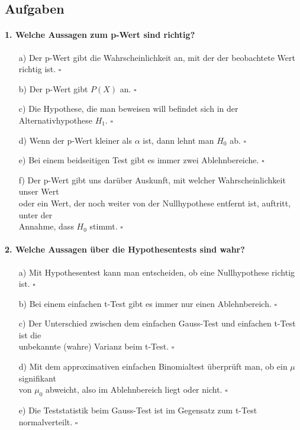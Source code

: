 \documentclass[a4paper]{article}
\begin{document}
\clearpage

\subsection{Aufgaben}
\paragraph{1. Welche Aussagen zum p-Wert sind richtig?}
\begin{itemize}
    \item[a)] Der p-Wert gibt die Wahrscheinlichkeit an, mit der der beobachtete Wert richtig ist. \hfill $\square$
    \item[b)] Der p-Wert gibt $P(X)$ an. \hfill $\square$
    \item[c)] Die Hypothese, die man beweisen will befindet sich in der Alternativhypothese $H_1$. \hfill $\square$
    \item[d)] Wenn der p-Wert kleiner als $\alpha$ ist, dann lehnt man $H_0$ ab. \hfill $\square$
    \item[e)] Bei einem beidseitigen Test gibt es immer zwei Ablehnbereiche. \hfill $\square$
    \item[f)] Der p-Wert gibt uns darüber Auskunft, mit welcher Wahrscheinlichkeit unser Wert \\oder ein Wert, der noch weiter von der Nullhypothese entfernt ist, auftritt, unter der\\ Annahme, dass $H_0$ stimmt. \hfill $\square$
\end{itemize}

\paragraph{2. Welche Aussagen über die Hypothesentests sind wahr?}
\begin{itemize}
    \item[a)] Mit Hypothesentest kann man entscheiden, ob eine Nullhypothese richtig ist. \hfill $\square$
    \item[b)] Bei einem einfachen t-Test gibt es immer nur einen Ablehnbereich. \hfill $\square$
    \item[c)] Der Unterschied zwischen dem einfachen Gauss-Test und einfachen t-Test ist die\\ unbekannte (wahre) Varianz beim t-Test. \hfill $\square$
    \item[d)] Mit dem approximativen einfachen Binomialtest überprüft man, ob ein $\mu$ signifikant\\ von $\mu_0$ abweicht, also im Ablehnbereich liegt oder nicht. \hfill $\square$
    \item[e)] Die Teststatistik beim Gauss-Test ist im Gegensatz zum t-Test normalverteilt. \hfill $\square$
\end{itemize}
\end{document}
